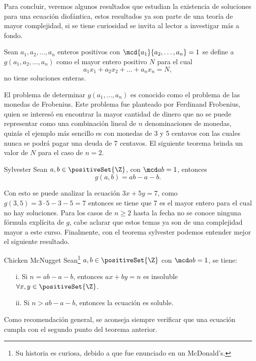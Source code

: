 Para concluir, veremos algunos resultados que estudian la existencia de soluciones para una ecuación diofántica, estos
resultados ya son parte de una teoría de mayor complejidad, si se tiene curiosidad se invita al lector a investigar más a fondo.

\begin{definition.box}{}{}
    Sean  $a_1,a_2,\ldots,a_n$ enteros positivos con $\mcd{a_1}{a_2,\ldots,a_n} = 1$ se define a $g(a_1,a_2,\ldots,a_n)$
    como el mayor entero positivo $N$ para el cual
    \[
        a_1 x_1 + a_2 x_2 + \ldots + a_n x_n = N,
    \]
    no tiene soluciones enteras.
\end{definition.box}

El problema de determinar $g(a_1,\ldots,a_n)$ es conocido como el problema de las monedas de Frobenius.
Este problema fue planteado por Ferdinand Frobenius, quien se interesó en encontrar la mayor cantidad de dinero que no
se puede representar como una combinación lineal de $n$ denominaciones de monedas,
quizás el ejemplo más sencillo es con monedas de 3 y 5 centavos con las cuales nunca se podrá pagar una deuda de 7 centavos.
El siguiente teorema brinda un valor de $N$ para el caso de $n=2$.

\begin{theorem.box}{Sylvester}{}
Sean $a,b \in \positiveSet{\Z}$, con $\mcd a b = 1$, entonces
    \[
        g(a,b) = ab - a - b.
    \]
\end{theorem.box}
Con esto se puede analizar la ecuación $3x + 5y = 7$, como $g(3,5) = 3\cdot 5 - 3 - 5 = 7$
entonces se tiene que 7 es el mayor entero para el cual no hay soluciones.
Para los casos de $n\geq2$ hasta la fecha no se conoce ninguna fórmula explícita de $g$, cabe aclarar que estos temas
ya son de una complejidad mayor a este curso.
Finalmente, con el teorema sylvester podemos entender mejor el siguiente resultado.

\begin{theorem.box}{Chicken McNugget}{}
    Sean\footnote{Su historia es curiosa, debido a que fue enunciado en un McDonald's.} $a, b\in \positiveSet{\Z}$ con $\mcd a b = 1$, se tiene:
    \begin{enumerate}
        \item[i.] Si $n = ab - a - b$, entonces $ax + by = n$ es insoluble $\forall x, y \in \positiveSet{\Z}$.
        \item[ii.] Si $n > ab - a - b$, entonces la ecuación es soluble.
    \end{enumerate}
\end{theorem.box}
Como recomendación general, se aconseja siempre verificar que una ecuación cumpla con el segundo punto del teorema anterior.




